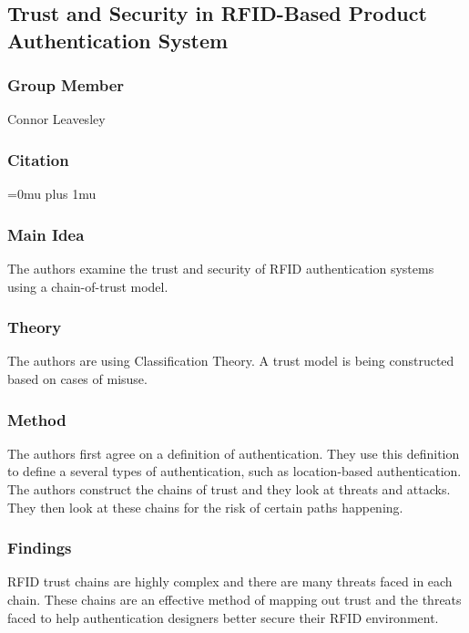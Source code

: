 \noindent
\subsection{Trust and Security in RFID-Based Product Authentication System}

\subsubsection{Group Member}

\noindent
Connor Leavesley

\noindent
\subsubsection{Citation}

\Urlmuskip=0mu plus 1mu\relax

\subsubsection{Main Idea}

\noindent
The authors examine the trust and security of RFID authentication systems using a chain-of-trust model. 

\subsubsection{Theory}

\noindent
The authors are using Classification Theory. A trust model is being constructed based on cases of misuse. 

\subsubsection{Method}

\noindent
The authors first agree on a definition of authentication. They use this definition to define a several types of authentication, such as location-based authentication. The authors construct the chains of trust and they look at threats and attacks. They then look at these chains for the risk of certain paths happening. 

\subsubsection{Findings}

\noindent
RFID trust chains are highly complex and there are many threats faced in each chain. These chains are an effective method of mapping out trust and the threats faced to help authentication designers better secure their RFID environment. 

